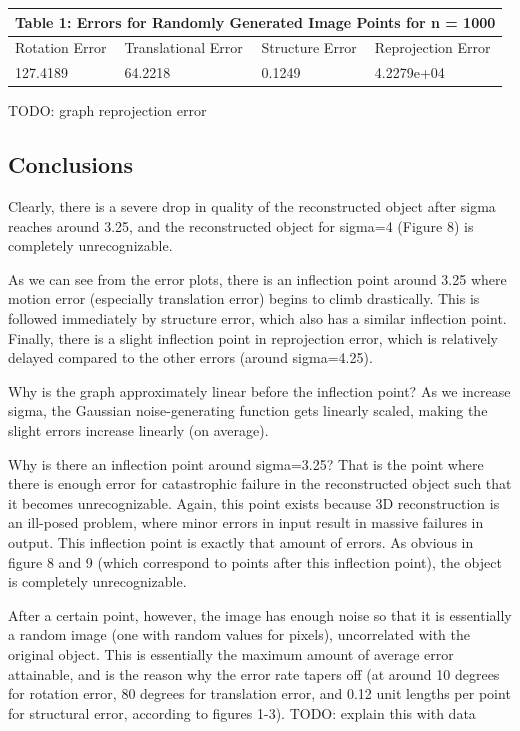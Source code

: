 \documentclass{article}
\begin{document}
\begin{tabular}{ |p{3cm}|p{3cm}|p{3cm}|p{3cm}|  }
 \hline
 \multicolumn{4}{|c|}{Table 1: Errors for Randomly Generated Image Points for n = 1000} \\
 \hline
 Rotation Error & Translational Error & Structure Error & Reprojection Error\\
 \hline
 127.4189 & 64.2218 & 0.1249 & 4.2279e+04\\
 \hline
\end{tabular}

TODO: graph reprojection error 


\subsection{Conclusions}

Clearly, there is a severe drop in quality of the reconstructed object after sigma reaches around 3.25, and the reconstructed object for sigma=4 (Figure 8) is completely unrecognizable.

As we can see from the error plots, there is an inflection point around 3.25 where motion error (especially translation error) begins to climb drastically. This is followed immediately by structure error, which also has a similar inflection point. Finally, there is a slight inflection point in reprojection error, which is relatively delayed compared to the other errors (around sigma=4.25).


Why is the graph approximately linear before the inflection point? As we increase sigma, the Gaussian noise-generating function gets linearly scaled, making the slight errors increase linearly (on average).

Why is there an inflection point around sigma=3.25? That is the point where there is enough error for catastrophic failure in the reconstructed object such that it becomes unrecognizable. Again, this point exists because 3D reconstruction is an ill-posed problem, where minor errors in input result in massive failures in output. This inflection point is exactly that amount of errors. As obvious in figure 8 and 9 (which correspond to points after this inflection point), the object is completely unrecognizable.


After a certain point, however, the image has enough noise so that it is essentially a random image (one with random values for pixels), uncorrelated with the original object. This is essentially the maximum amount of average error attainable, and is the reason why the error rate tapers off (at around 10 degrees for rotation error, 80 degrees for translation error, and 0.12 unit lengths per point for structural error, according to figures 1-3). TODO: explain this with data
\end{document}
